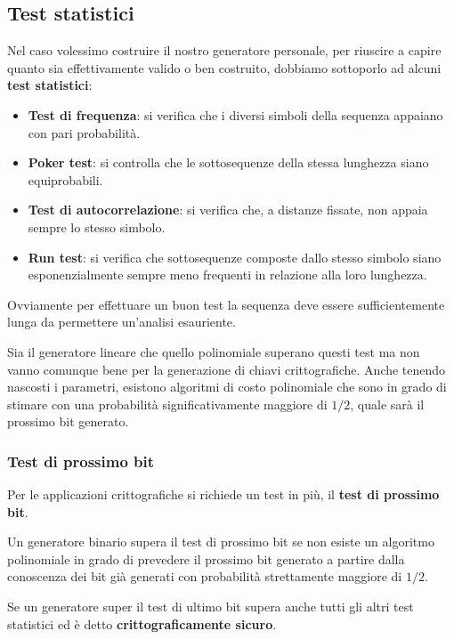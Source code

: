 \subsection{Test statistici}
Nel caso volessimo costruire il nostro generatore personale, per riuscire a capire quanto sia effettivamente valido o
ben costruito, dobbiamo sottoporlo ad alcuni \textbf{test statistici}:
\begin{itemize}
	\item \textbf{Test di frequenza}: si verifica che i diversi simboli della sequenza appaiano con pari probabilit\`a.
	\item \textbf{Poker test}: si controlla che le sottosequenze della stessa lunghezza siano equiprobabili.
	\item \textbf{Test di autocorrelazione}: si verifica che, a distanze fissate, non appaia sempre lo stesso simbolo.
	\item \textbf{Run test}: si verifica che sottosequenze composte dallo stesso simbolo siano esponenzialmente sempre
	      meno frequenti in relazione alla loro lunghezza.
\end{itemize}
Ovviamente per effettuare un buon test la sequenza deve essere sufficientemente lunga da permettere un'analisi esauriente.

Sia il generatore lineare che quello polinomiale superano questi test ma non vanno comunque bene per la generazione di
chiavi crittografiche. Anche tenendo nascosti i parametri, esistono algoritmi di costo polinomiale che sono in grado di
stimare con una probabilit\`a significativamente maggiore di $1/2$, quale sar\`a il prossimo bit generato.

\subsubsection{Test di prossimo bit}
Per le applicazioni crittografiche si richiede un test in pi\`u, il \textbf{test di prossimo bit}.

Un generatore binario supera il test di prossimo bit se non esiste un algoritmo polinomiale in grado di prevedere il
prossimo bit generato a partire dalla conoscenza dei bit gi\`a generati con probabilit\`a strettamente maggiore di $1/2$.

Se un generatore super il test di ultimo bit supera anche tutti gli altri test statistici ed \`e detto
\textbf{crittograficamente sicuro}.

